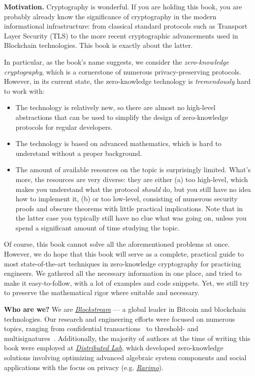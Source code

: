 \documentclass[../../book]{subfiles}
\begin{document}
\textbf{Motivation.} Cryptography is wonderful. If you are holding this book, you are probably 
already know the significance of cryptography in the modern 
informational infrastructure: from classical standard protocols such as 
Transport Layer Security (TLS) to the more recent cryptographic
advancements used in Blockchain technologies. This book is 
exactly about the latter.

In particular, as the book's name suggests, we consider the \emph{zero-knowledge
cryptography}, which is a cornerstone of numerous privacy-preserving protocols.
However, in its current state, the zero-knowledge technology is
\emph{tremendously} hard to work with:
\begin{itemize}
    \item The technology is relatively new, so there are almost 
    no high-level abstractions that can be used to simplify the
    design of zero-knowledge protocols for regular developers.
    \item The technology is based on advanced mathematics, which is hard to
    understand without a proper background.
    \item The amount of available resources on the topic is surprisingly limited.
    What's more, the resources are very diverse: they are either (a) too
    high-level, which makes you understand what the protocol \emph{should} do,
    but you still have no idea how to implement it, (b) or too low-level,
    consisting of numerous security proofs and obscure theorems with little
    practical implications. Note that in the latter case you typically still
    have no clue what was going on, unless you spend a significant amount of
    time studying the topic.
\end{itemize}

Of course, this book cannot solve all the aforementioned problems at once.
However, we do hope that this book will serve as a complete, practical guide to
most state-of-the-art techniques in zero-knowledge cryptography for practicing
engineers. We gathered all the necessary information in one place, and tried to
make it easy-to-follow, with a lot of examples and code snippets. Yet, we still
try to preserve the mathematical rigor where suitable and necessary.

\textbf{Who are we?} We are \href{https://blockstream.com/}{\emph{Blockstream}}
--- a global leader in Bitcoin and blockchain technologies. 
Our research and engineering efforts were focused on numerous topics, ranging 
from confidential transactions~\cite{FC:PBFMW18} to threshold- and multisignatures~\cite{C:NicRufSeu21}.
Additionally, the majority of authors at the time of writing this book were employed
at \href{https://distributedlab.com/}{\emph{Distributed Lab}}, which developed 
zero-knowledge solutions involving optimizing advanced algebraic
system components and social applications with the focus on privacy (e.g.
\href{https://rarimo.com/}{\emph{Rarimo}}).
\end{document}
